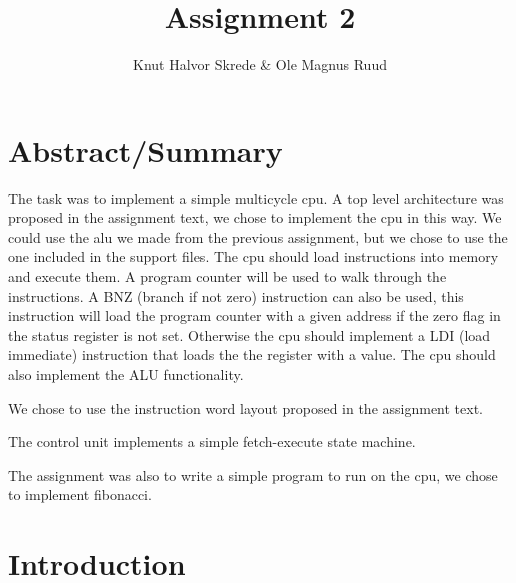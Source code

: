 \documentclass[10pt]{article}
\title{Assignment 2}
\author{Knut Halvor Skrede \& Ole Magnus Ruud}
\begin{document}
	\maketitle
	\clearpage


	\section*{Abstract/Summary}


	The task was to implement a simple multicycle cpu. A top level architecture was proposed in the assignment text, we chose to implement the cpu in this way. We could use the alu we made from the previous assignment, but we chose to use the one included in the support files. The cpu should load instructions into memory and execute them. A program counter will be used to walk through the instructions. A BNZ (branch if not zero) instruction can also be used, this instruction will load the program counter with a given address if the zero flag in the status register is not set. Otherwise the cpu should implement a LDI (load immediate) instruction that loads the the register with a value. The cpu should also implement the ALU functionality.

We chose to use the instruction word layout proposed in the assignment text.

The control unit implements a simple fetch-execute state machine.

The assignment was also to write a simple program to run on the cpu, we chose to implement fibonacci.

	\section*{Introduction}

\end{document}

